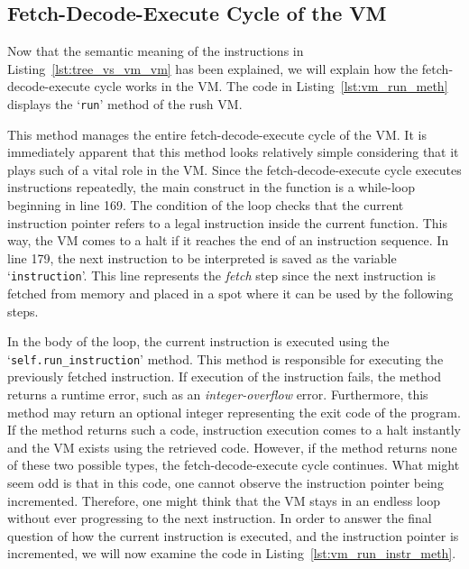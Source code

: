 \subsection{Fetch-Decode-Execute Cycle of the VM}
Now that the semantic meaning of the instructions in Listing~\ref{lst:tree_vs_vm_vm} has been explained, we will explain how the fetch-decode-execute cycle works in the VM\@.
The code in Listing~\ref{lst:vm_run_meth} displays the `\texttt{run}' method of the rush VM\@.


This method manages the entire fetch-decode-execute cycle of the VM\@.
It is immediately apparent that this method looks relatively simple considering that it plays such of a vital role in the VM\@.
Since the fetch-decode-execute cycle executes instructions repeatedly, the main construct in the function is a while-loop beginning in line 169.
The condition of the loop checks that the current instruction pointer refers to a legal instruction inside the current function.
This way, the VM comes to a halt if it reaches the end of an instruction sequence.
In line 179, the next instruction to be interpreted is saved as the variable `\texttt{instruction}'.
This line represents the \emph{fetch} step since the next instruction is fetched from memory and placed in a spot where it can be used by the following steps.

In the body of the loop, the current instruction is executed using the `\texttt{self.run\_instruction}' method.
This method is responsible for executing the previously fetched instruction.
If execution of the instruction fails, the method returns a runtime error, such as an \emph{integer-overflow} error.
Furthermore, this method may return an optional integer representing the exit code of the program.
If the method returns such a code, instruction execution comes to a halt instantly and the VM exists using the retrieved code.
However, if the method returns none of these two possible types, the fetch-decode-execute cycle continues.
What might seem odd is that in this code, one cannot observe the instruction pointer being incremented.
Therefore, one might think that the VM stays in an endless loop without ever progressing to the next instruction.
In order to answer the final question of how the current instruction is executed, and the instruction pointer is incremented, we will now examine the code in Listing~\ref{lst:vm_run_instr_meth}.


